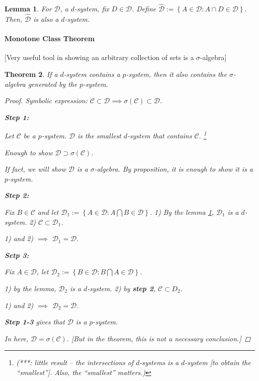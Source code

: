 \documentclass[11pt]{article}
\newtheorem{theorem}{Theorem}[subsection]
\newtheorem{lemma}[theorem]{Lemma}
\begin{document}
\begin{lemma}
  For $\mathcal D$, a $d$-system, fix $D\in \mathcal D$. Define $\hat { \mathcal D}
  := \left\{ A \in \mathcal D : A\cap D \in \mathcal D \right\}$. Then, $\hat
  {\mathcal D} $ is also a $d$-system.
  \label{hw:homework-week1}
\end{lemma}

\paragraph{Monotone Class Theorem}

[Very useful tool in showing an arbitrary collection of sets is a $\sigma$-algebra]

\begin{theorem}
  If a $d$-system contains a $p$-system, then it also contains the
  $\sigma$-algebra generated by the $p$-system.
  \label{thm:monotone-class-theorem}
  \begin{proof}
    Symbolic expression: $\mathcal C \subset \mathcal D \implies \sigma
    (\mathcal C) \subset \mathcal D$.

    \textbf{Step 1: }


    Let $\mathcal C$ be a $p$-system. $\mathcal D$ is the smallest $d$-system
    that contains $\mathcal C$. 
    \footnote{(***: little result -- the intersections of
    $d$-systems is a $d$-system [to obtain the ``smallest'']. Also, the
  ``smallest'' matters.)}

    Enough to show $\mathcal D \supset \sigma (\mathcal C)$. 

    If fact, we will show $\mathcal D$ is a $\sigma$-algebra. By proposition, it
    is enough to show it is a $p$-system. 

    \textbf{Step 2: }

    Fix $B \in \mathcal C$ and let $\mathcal D_1 := \left\{ A \in \mathcal D : A
    \bigcap B \in \mathcal D\right\}$. 1) By the lemma \ref{hw:homework-week1},
    $\mathcal D_1$ is a $d$-system. 2) $\mathcal C \subset \mathcal D_1$. 

    1) and 2) $\implies $ $\mathcal D_1 = \mathcal D$.


    \textbf{Setp 3: }

    Fix $A\in \mathcal D$, let $\mathcal D_2 := \left\{ B \in \mathcal D :
    B\bigcap A \in \mathcal D \right\}$. 

    1) by the lemma, $\mathcal D_2$ is a $d$-system. 2) by \textbf{step 2},
    $\mathcal C \subset D_2$. 

    1) and 2) $\implies$ $\mathcal D_2 = \mathcal D$. 



    \textbf{Step 1-3} gives that $\mathcal D$ is a $p$-system.




    In here, $\mathcal D = \sigma ( \mathcal C)$. [But in the theorem, this is
    not a necessary conclusion.]
  \end{proof}
\end{theorem}
\end{document}

